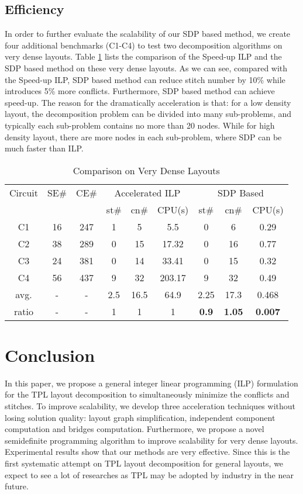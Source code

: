 \documentclass[10pt,conference]{IEEEtran}
\begin{document}
\subsection{Efficiency }

In order to further evaluate the scalability of our SDP based method, we create four additional benchmarks (C1-C4) to test two decomposition algorithms on very dense layouts.
Table \ref{tab:result2} lists the comparison of the Speed-up ILP and the SDP based method on these very dense layouts.
As we can see, compared with the Speed-up ILP, SDP based method can reduce stitch number by 10\% while introduces 5\% more conflicts.
Furthermore, SDP based method can achieve  speed-up.
The reason for the dramatically acceleration is that: for a low density layout, the decomposition problem can be divided into many sub-problems, and typically each sub-problem contains no more than 20 nodes. While for high density layout, there are more nodes in each sub-problem, where SDP can be much faster than ILP.



\begin{table}[thb]
\centering
\caption{Comparison on Very Dense Layouts}
\label{tab:result2}
\begin{tabular}{|c|c|c|c|c|c|c|c|c|}
	\hline \hline
	Circuit	& SE\#&CE\#	& \multicolumn{3}{|c}{Accelerated ILP}	& \multicolumn{3}{|c|}{SDP Based}\\
	\cline{4-9}
			&	&	& st\#	& cn\#	& CPU(s)		& st\#	& cn\#	& CPU(s)\\
	\hline
	C1	& 16	&247	& 1 	& 5	& 5.5		& 0 & 6	& 0.29	\\
	C2	& 38	&289& 0	& 15	& 17.32	& 0 & 16	& 0.77 	\\
	C3	& 24	&381& 0 	& 14	& 33.41 	& 0 & 15	& 0.32 	\\
	C4	& 56 &437& 9	& 32	& 203.17	& 9 & 32	& 0.49	\\
	\hline
	avg.	& -	& -	& 2.5	&16.5&64.9	& 2.25&17.3&0.468	\\
	ratio	& -	& -	& 1	& 1	& 1		& \textbf{0.9}	& \textbf{1.05} & \textbf{0.007} \\
	\hline \hline
\end{tabular}
\end{table}
 

\section{Conclusion}
\label{chap:conclusion}

In this paper, we propose a general integer linear programming (ILP) formulation for the TPL layout decomposition to simultaneously minimize the conflicts  and stitches.
To improve scalability, we develop three acceleration techniques without losing solution quality:
layout graph simplification, independent component computation and bridges computation. 
Furthermore, we propose a novel semidefinite programming algorithm to improve scalability for very dense layouts.
Experimental results show that our methods are very effective. Since this is the first systematic attempt on TPL layout decomposition for general layouts, we expect to see a lot of researches as TPL may be adopted by industry in the near future.


\vspace{-.1in}


\end{document}
